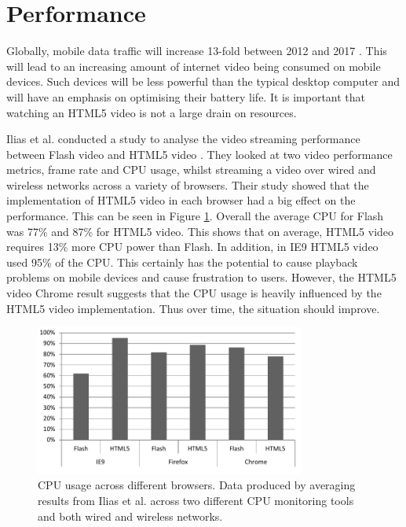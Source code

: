 \documentclass[journal]{IEEEtran}
\begin{document}
\section{Performance}
Globally, mobile data traffic will increase 13-fold between 2012 and 2017 \cite{website:ciscoForecastAndMethodology}. This will lead to an increasing amount of internet video being consumed on mobile devices. Such devices will be less powerful than the typical desktop computer and will have an emphasis on optimising their battery life. It is important that watching an HTML5 video is not a large drain on resources. %

Ilias et al. conducted a study to analyse the video streaming performance between Flash video and HTML5 video \cite{inproceedings:aStudyOfVideoPerformanceAnalysis}. They looked at two video performance metrics, frame rate and CPU usage, whilst streaming a video over wired and wireless networks across a variety of browsers. Their study showed that the implementation of HTML5 video in each browser had a big effect on the performance. This can be seen in Figure \ref{fig:cpuPerformanceGraph}. Overall the average CPU for Flash was 77\% and 87\% for HTML5 video. This shows that on average, HTML5 video requires 13\% more CPU power than Flash. In addition, in IE9 HTML5 video used 95\% of the CPU. This certainly has the potential to cause playback problems on mobile devices and cause frustration to users. However, the HTML5 video Chrome result suggests that the CPU usage is heavily influenced by the HTML5 video implementation. Thus over time, the situation should improve.


\begin{figure}[!t]
\centering
\includegraphics[width=3.5in]{cpu-performance-graph}
\caption{CPU usage across different browsers. Data produced by averaging results from Ilias et al. \cite{inproceedings:aStudyOfVideoPerformanceAnalysis} across two different CPU monitoring tools and both wired and wireless networks.}
\label{fig:cpuPerformanceGraph}
\end{figure} 
\end{document}
